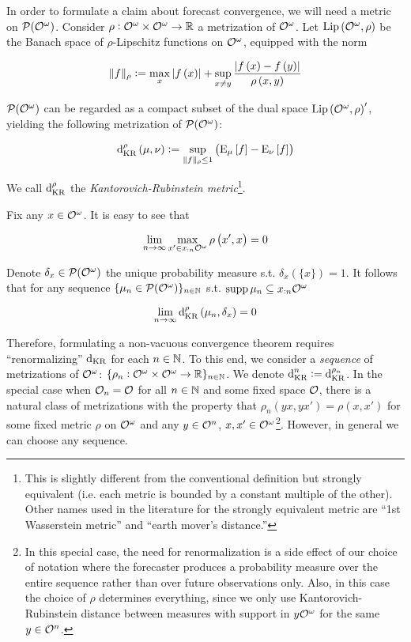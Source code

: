 In order to formulate a claim about forecast convergence, we will need a metric on $\mathcal{P}(\mathcal{O}^\omega)$. Consider $\rho: \mathcal{O}^\omega \times \mathcal{O}^\omega \rightarrow \mathbb{R}$ a metrization of $\mathcal{O}^\omega$. Let ${\operatorname{Lip}}\left(\mathcal{O}^\omega,\rho\right)$ be the Banach space of $\rho$-Lipschitz functions on $\mathcal{O}^\omega$, equipped with the norm

\begin{equation}
\lVert f \rVert_\rho:=\max_{x}{\lvert f\left(x\right) \rvert} + \sup_{x \ne y} \frac{\lvert f\left(x\right)-f\left(y\right) \rvert}{\rho\left(x,y\right)}
\end{equation}

$\mathcal{P}(\mathcal{O}^\omega)$ can be regarded as a compact subset of the dual space ${\operatorname{Lip}}\left(\mathcal{O}^\omega,\rho\right)'$, yielding the following metrization of $\mathcal{P}(\mathcal{O}^\omega)$:

\begin{equation}
\operatorname{d}_{\textnormal{KR}}^\rho\left(\mu,\nu\right):=\sup_{\lVert f \rVert_\rho \leq 1}{\left(\operatorname{E}_\mu\left[f\right] - \operatorname{E}_\nu\left[f\right]\right)}
\end{equation}

We call $\operatorname{d}_{\textnormal{KR}}^\rho$ the \emph{Kantorovich-Rubinstein metric}\footnote{This is slightly different from the conventional definition but strongly equivalent (i.e. each metric is bounded by a constant multiple of the other). Other names used in the literature for the strongly equivalent metric are \enquote{1st Wasserstein metric} and \enquote{earth mover's distance.}}.

Fix any $x \in \mathcal{O}^\omega$. It is easy to see that

\begin{equation}
\lim_{n \rightarrow \infty} \max_{x' \in x_{:n}\mathcal{O}^\omega} \rho\left(x', x\right) = 0
\end{equation}

Denote $\delta_x \in \mathcal{P}(\mathcal{O}^\omega)$ the unique probability measure s.t. $\delta_x\left(\{x\}\right)=1$. It follows that for any sequence $\{\mu_n \in \mathcal{P}(\mathcal{O}^\omega)\}_{n \in \mathbb{N}}$ s.t. $\operatorname{supp}{\mu_n} \subseteq x_{:n}\mathcal{O}^\omega$

\begin{equation}
\lim_{n \rightarrow \infty} \operatorname{d}_{\textnormal{KR}}^\rho\left(\mu_n, \delta_x\right) = 0
\end{equation}

Therefore, formulating a non-vacuous convergence theorem requires \enquote{renormalizing} $\operatorname{d}_{\textnormal{KR}}$ for each $n \in \mathbb{N}$. To this end, we consider a \emph{sequence} of metrizations of $\mathcal{O}^\omega$: $\{\rho_n: \mathcal{O}^\omega \times \mathcal{O}^\omega \rightarrow \mathbb{R}\}_{n \in \mathbb{N}}$. We denote $\operatorname{d}_{\textnormal{KR}}^n:=\operatorname{d}_{\textnormal{KR}}^{\rho_n}$. In the special case when $\mathcal{O}_n=\mathcal{O}$ for all $n \in \mathbb{N}$ and some fixed space $\mathcal{O}$, there is a natural class of metrizations with the property that $\rho_n(yx,yx')=\rho(x,x')$ for some fixed metric $\rho$ on $\mathcal{O}^\omega$ and any $y \in \mathcal{O}^n$, $x,x' \in \mathcal{O}^\omega$\footnote{In this special case, the need for renormalization is a side effect of our choice of notation where the forecaster produces a probability measure over the entire sequence rather than over future observations only. Also, in this case the choice of $\rho$ determines everything, since we only use Kantorovich-Rubinstein distance between measures with support in $y\mathcal{O}^\omega$ for the same $y \in \mathcal{O}^n$.}. However, in general we can choose any sequence.

